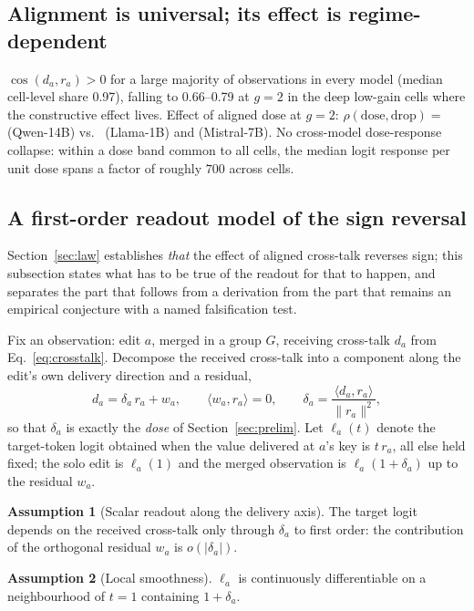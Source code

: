 \documentclass[preprint,12pt]{elsarticle}
\theoremstyle{definition}
\newtheorem{assumption}{Assumption}
\begin{document}
\subsection{Alignment is universal; its effect is regime-dependent}
$\cos(d_a,r_a)>0$ for a large majority of observations in every model (median cell-level share 0.97), falling to 0.66--0.79 at $g{=}2$ in the deep low-gain cells where the constructive effect lives. Effect of
aligned dose at $g{=}2$: $\rho(\text{dose},\text{drop})=$ \projRhoFourteenB{}
(Qwen-14B) vs.\ \projRhoLlamaOneB{} (Llama-1B) and \projRhoMistral{} (Mistral-7B). No
cross-model dose-response collapse: within a dose band common to all \nCells{}
cells, the median logit response per unit dose spans a factor of roughly $700$
across cells.
\subsection{A first-order readout model of the sign reversal}\label{sec:mech}
Section~\ref{sec:law} establishes \emph{that} the effect of aligned cross-talk reverses
sign; this subsection states what has to be true of the readout for that to happen, and
separates the part that follows from a derivation from the part that remains an empirical
conjecture with a named falsification test.

Fix an observation: edit $a$, merged in a group $G$, receiving cross-talk $d_a$ from
Eq.~\ref{eq:crosstalk}. Decompose the received cross-talk into a component along the
edit's own delivery direction and a residual,
\begin{equation}
d_a=\delta_a\,r_a+w_a,\qquad \langle w_a,r_a\rangle=0,\qquad
\delta_a=\frac{\langle d_a,r_a\rangle}{\lVert r_a\rVert^{2}},
\label{eq:decomp}
\end{equation}
so that $\delta_a$ is exactly the \emph{dose} of Section~\ref{sec:prelim}. Let
$\ell_a(t)$ denote the target-token logit obtained when the value delivered at $a$'s key
is $t\,r_a$, all else held fixed; the solo edit is $\ell_a(1)$ and the merged
observation is $\ell_a(1+\delta_a)$ up to the residual $w_a$.

\begin{assumption}[Scalar readout along the delivery axis]\label{as:scalar}
The target logit depends on the received cross-talk only through $\delta_a$ to first
order: the contribution of the orthogonal residual $w_a$ is $o(|\delta_a|)$.
\end{assumption}
\begin{assumption}[Local smoothness]\label{as:smooth}
$\ell_a$ is continuously differentiable on a neighbourhood of $t=1$ containing
$1+\delta_a$.
\end{assumption}
\end{document}
